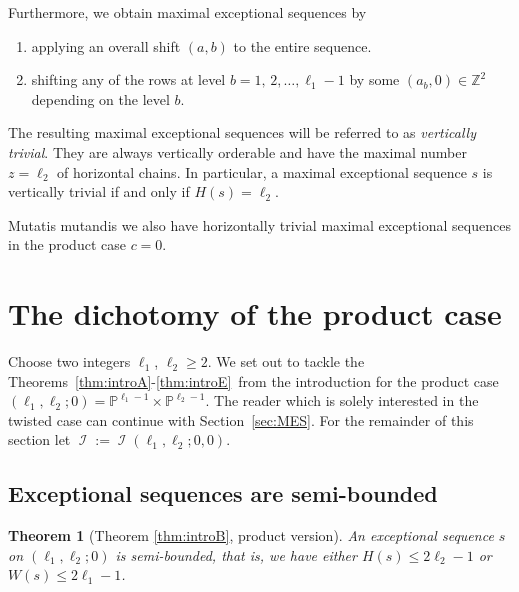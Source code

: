 \documentclass[11pt]{article}
\newtheorem{theorem}[theo]{Theorem}
\theoremstyle{definition}
\numberwithin{equation}{section}
\newcommand{\PP}{\mathbb P}
\newcommand{\Z}{\mathbb Z}
\newcommand{\CI}{{\mathcal I}}
\newcommand{\nImm}{\operatorname{\CI}}
\newcommand{\cl}{s}
\newcommand{\mes}{maximal exceptional sequence}
\newcommand{\thLex}{\ref{thm:introA}}
\newcommand{\thHeight}{\ref{thm:introB}}
\newcommand{\thFull}{\ref{thm:introE}}
\begin{document}
{Furthermore, we obtain {\mes}s by 
\begin{enumerate}
\item[(i)] applying an overall shift $(a,b)$ 
to the entire sequence.
\vspace{1ex}
\item[(ii)] shifting any of the rows at level 
$b=1,\,2,\ldots,\ell_1-1$ by {some} $(a_b,0)\in\Z^2$ 
depending on the level $b$.
\end{enumerate}
The resulting {\mes}s will be referred to as 
{\em vertically trivial}. They are always
vertically orderable and have the maximal number
$z=\ell_2$ of horizontal chains. In 
particular, a {\mes} $\cl$ is vertically 
trivial if and only if $H(\cl)=\ell_2$.}

Mutatis mutandis we also have horizontally 
trivial {\mes}s in the product case $c=0$.

\section{The dichotomy of the product case}
\label{sec:ProdCase}
Choose two integers $\ell_1$, $\ell_2\geq2$. 
We set out to tackle the Theorems~\thLex-\thFull\ from 
the introduction for the product 
case $(\ell_1,\ell_2;0)=\PP^{\ell_1-1}
\times\PP^{\ell_2-1}$. The reader which
is solely interested in the twisted case
can continue with Section~\ref{sec:MES}.
For the remainder of this section {let}
$\nImm:=\nImm(\ell_1,\ell_2;0,0)$. 

\subsection{Exceptional sequences 
are semi-bounded}
\label{subsec:ThmBProdCase}

\begin{theorem}[Theorem {\thHeight}, 
product version]
\label{thm:SlimPaPb}
An exceptional sequence $\cl$ on 
$(\ell_1,\ell_2;0)$ is semi-bounded, 
that is, we have either $H(s)\leq2\ell_2-1$ 
or $W(s)\leq2\ell_1-1$.
\end{theorem}
\end{document}
